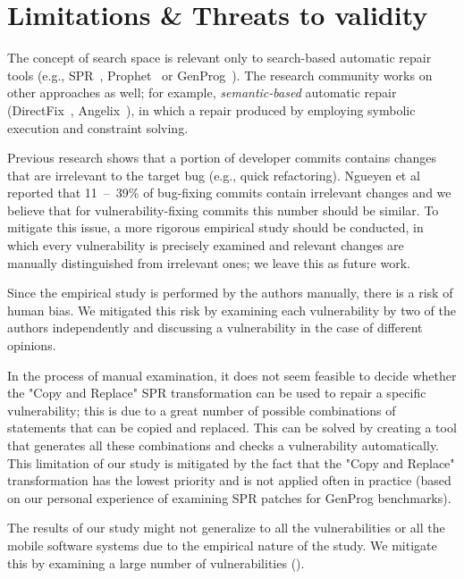 \section{Limitations \& Threats to validity}
\label{section:limitations}

The concept of search space is relevant only to search-based automatic repair tools (e.g., SPR~\cite{long2015staged}, Prophet~\cite{long2015prophet} or GenProg~\cite{le2012systematic}).
The research community works on other approaches as well; for example, \emph{semantic-based} automatic repair (DirectFix~\cite{directfix}, Angelix~\cite{mechtaev2016angelix}), in which a repair produced by employing symbolic execution and constraint solving.

Previous research shows that a portion of developer commits contains changes that are irrelevant to the target bug (e.g., quick refactoring).
Ngueyen et al~\cite{nguyen2013filtering} reported that 11~--~39\% of bug-fixing commits contain irrelevant changes and we believe that for vulnerability-fixing commits this number should be similar.
To mitigate this issue, a more rigorous empirical study should be conducted, in which every vulnerability is precisely examined and relevant changes are manually distinguished from irrelevant ones; we leave this as future work.

Since the empirical study is performed by the authors manually, there is a risk of human bias.
We mitigated this risk by examining each vulnerability by two of the authors independently and discussing a vulnerability in the case of different opinions.

In the process of manual examination, it does not seem feasible to decide whether the "Copy and Replace" SPR transformation can be used to repair a specific vulnerability; this is due to a great number of possible combinations of statements that can be copied and replaced.
This can be solved by creating a tool that generates all these combinations and checks a vulnerability automatically.
This limitation of our study is mitigated by the fact that the "Copy and Replace" transformation has the lowest priority and is not applied often in practice (based on our personal experience of examining SPR patches for GenProg benchmarks).

The results of our study might not generalize to all the vulnerabilities or all the mobile software systems due to the empirical nature of the study.
We mitigate this by examining a large number of vulnerabilities (\numvuln).
